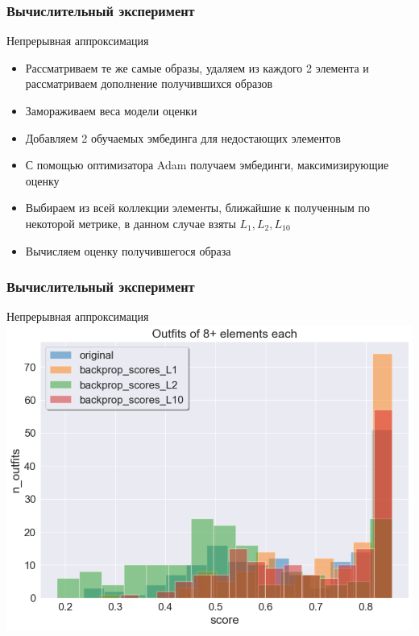 \documentclass[10pt]{beamer}
\begin{document}
\begin{frame}
	\frametitle{Вычислительный эксперимент}
	\begin{block}{Непрерывная аппроксимация}
		\begin{itemize}
			\item Рассматриваем те же самые образы, удаляем из каждого 2 элемента и рассматриваем дополнение получившихся образов
			\item Замораживаем веса модели оценки
			\item Добавляем 2 обучаемых эмбединга для недостающих элементов
			\item С помощью оптимизатора Adam получаем эмбединги, максимизирующие оценку
			\item Выбираем из всей коллекции элементы, ближайшие к полученным по некоторой метрике, в данном случае взяты $L_1, L_2, L_{10}$
			\item Вычисляем оценку получившегося образа
		\end{itemize}
	\end{block}
\end{frame}

\begin{frame}
	\frametitle{Вычислительный эксперимент}
	\begin{block}{Непрерывная аппроксимация}
		\includegraphics[scale = 0.52]{../figures/backprop_at_least_8.png}
	\end{block}
\end{frame}
\end{document}
